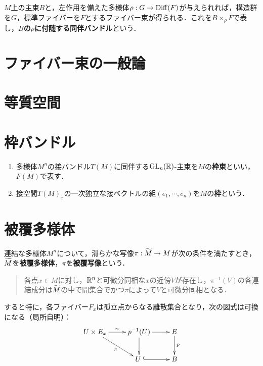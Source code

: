 \documentclass[uplatex,dvipdfmx]{jsreport}
\begin{document}
\begin{definition}
    $M$上の主束$B$と，左作用を備えた多様体$\rho:G\to\mathrm{Diff}(F)$が与えられれば，構造群を$G$，標準ファイバーを$F$とするファイバー束が得られる．これを$B\times_\rho F$で表し，\textbf{$B$の$\rho$に付随する同伴バンドル}という．
\end{definition}

\section{ファイバー束の一般論}

\section{等質空間}

\section{枠バンドル}

\begin{definition}\mbox{}
    \begin{enumerate}
        \item 多様体$M^n$の接バンドル$T(M)$に同伴する$\mathrm{GL}_n(\mathbb{R})$-主束を$M$の\textbf{枠束}といい，$F(M)$で表す．
        \item 接空間$T(M)_x$の一次独立な接ベクトルの組$(e_1,\cdots,e_n)$を$M$の\textbf{枠}という．
    \end{enumerate}
\end{definition}

\section{被覆多様体}

\begin{tcolorbox}[colframe=ForestGreen, colback=ForestGreen!10!white,breakable,colbacktitle=ForestGreen!40!white,coltitle=black,fonttitle=\bfseries\sffamily,
title=]
    
\end{tcolorbox}

\begin{definition}
    連結な多様体$M^n$について，滑らかな写像$\pi:\widetilde{M}\to M$が次の条件を満たすとき，$\widetilde{M}$を\textbf{被覆多様体}，$\pi$を\textbf{被覆写像}という．
    \begin{quote}
        各点$x\in M$に対し，$\mathbb{R}^n$と可微分同相な$x$の近傍$V$が存在し，$\pi^{-1}(V)$の各連結成分は$\widetilde{M}$の中で開集合でかつ$\pi$によって$V$と可微分同相となる．
    \end{quote}
\end{definition}
\begin{remarks}
    すると特に，各ファイバー$F_x$は孤立点からなる離散集合となり，次の図式は可換になる（局所自明）：
    \[\xymatrix{
        U\times E_x\ar[r]^-\sim\ar[dr]_-\pi&p^{-1}(U)\ar[d]\ar[r]&E\ar[d]^-{p}\\
        &U \;\ar@{^{(}->}[r]&B
    }\]
\end{remarks}
\end{document}
